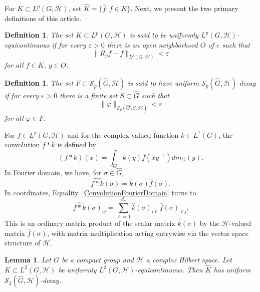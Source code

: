 \documentclass[10pt,a4paper]{amsart}
\newtheorem{lemma}[theorem]{Lemma}
\newtheorem{definition}[theorem]{Definition}
\begin{document}
For $K\subset L^p(G,\mathcal{H})$,  set 
$\widehat K=\{\widehat f:f\in K\}$.
Next, we present the two primary definitions of this article.
\begin{definition}\label{def:equicont}
The set $K\subset L^p(G,\mathcal{H})$ is  said to be uniformly $L^p(G,\mathcal{H})$-equicontinuous if for every
$\varepsilon>0$ there is an open neighborhood $O$ of $e$ such that $$\|R_yf-f\|_{L^p(G,\mathcal{H})}
<\varepsilon$$ for all $f\in K,\ y\in O$.
\end{definition}

\begin{definition}\label{def:decay}
The set $F\subset \mathscr{S}_p(\widehat{G},\mathcal{H})$ is said to have uniform $ \mathscr{S}_p(\widehat{G},\mathcal{H})$-decay if for every
$\varepsilon>0$ there is a finite set $S\subset\widehat{G}$ such that  $$\|\varphi\|_{\mathscr{S}_p(\widehat{G}\setminus
S,\mathcal{H})}<\varepsilon$$ for all $\varphi\in F$.
\end{definition}

\bigskip

For $f\in L^p(G,\mathcal{H})$ and for the complex-valued function $k\in L^1(G)$, the convolution $f*k$ is defined by 
\begin{equation}\label{Convolution}
(f*k)(x)=\int_G k(y)f(xy^{-1})
dm_G(y).
\end{equation}
 In Fourier domain, we have, for $\sigma\in\widehat{G}$,
\begin{equation}\label{ConvolutionFourierDomain}
\widehat{f*k}(\sigma)=\widehat k(\sigma)\widehat f(\sigma).
\end{equation}
In coordinates,  Equality~\ref{ConvolutionFourierDomain} turns to $$\widehat{f*k}(\sigma)_{ij}=\sum_{\ell=1}^{d_\sigma}\widehat k(\sigma)_{i\ell}
\,\widehat{f}(\sigma)_{\ell j}.$$
This is an ordinary matrix product of the scalar
matrix $\widehat k(\sigma)$ by the $\mathcal{H}$-valued matrix $\widehat{f}(\sigma)$, with
matrix multiplication acting entrywise via the vector space structure of $\mathcal{H}$. 

\bigskip


\begin{lemma}\label{lem:decay}
Let $G$ be a compact group and $\mathcal{H}$ a complex Hilbert space. Let $K\subset L^2(G,\mathcal{H})$ be uniformly $L^2(G,\mathcal{H})$-equicontinuous. Then $\widehat K$
has uniform $\mathscr{S}_2(\widehat{G},\mathcal{H})$-decay.
\end{lemma}
\end{document}
